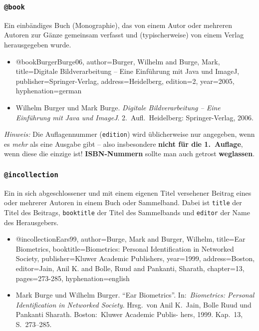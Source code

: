\subsubsection{\texttt{@book}}
\label{sec:@book}
Ein einbändiges Buch (Monographie), das von einem Autor oder mehreren Autoren zur Gänze gemeinsam verfasst und (typischerweise) von einem Verlag herausgegeben wurde.
% 
\begin{itemize}
\item[] 
\begin{GenericCode}[numbers=none]
@book{BurgerBurge06,
    author={Burger, Wilhelm and Burge, Mark},
    title={Digitale Bildverarbeitung -- 
           Eine Einführung mit Java und ImageJ},
    publisher={Springer-Verlag},
    address={Heidelberg},
    edition={2},
    year={2005},
    hyphenation={german}
}
\end{GenericCode}
\item[\cite{BurgerBurge06}]
Wilhelm Burger und Mark Burge. \textit{Digitale Bildverarbeitung -- Eine
Einführung mit Java und ImageJ}. 2.\ Aufl.\ Heidelberg: Springer-Verlag,
2006.
\end{itemize}
%
\emph{Hinweis:} Die Auflagennummer (\texttt{edition}) wird üblicherweise nur angegeben, 
wenn es \emph{mehr} als eine Ausgabe gibt -- also insbesondere \textbf{nicht für die 1.\ Auflage}, 
wenn diese die einzige ist!
\textbf{ISBN-Nummern} sollte man auch getrost \textbf{weglassen}.


\subsubsection{\texttt{@incollection}}
\label{sec:@incollection}
Ein in sich abgeschlossener und mit einem eigenen Titel versehener
Beitrag eines oder mehrerer Autoren in einem Buch oder Sammelband.
Dabei ist \texttt{title} der Titel des Beitrags, \texttt{booktitle} der Titel des Sammelbands und
\texttt{editor} der Name des Herausgebers.
%
\begin{itemize}
\item[] 
\begin{GenericCode}[numbers=none]
@incollection{Ears99,
  author={Burge, Mark and Burger, Wilhelm},
  title={Ear Biometrics},
  booktitle={Biometrics: Personal Identification in Networked Society},
  publisher={Kluwer Academic Publishers},
  year={1999},
  address={Boston},
  editor={Jain, Anil K. and Bolle, Ruud and Pankanti, Sharath},
  chapter={13},
  pages={273-285},
  hyphenation={english}
}
\end{GenericCode}
\item[\cite{Ears99}]
Mark Burge und Wilhelm Burger. "`Ear Biometrics"'. In:\ \textit{Biometrics:
Personal Identification in Networked Society}. Hrsg.\ von Anil K.\ Jain,
Bolle Ruud und Pankanti Sharath. Boston:\ Kluwer Academic Publis-
hers, 1999. Kap.\ 13, S.\ 273--285.
\end{itemize}

